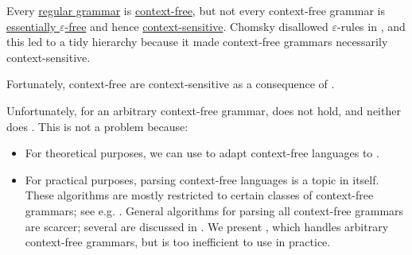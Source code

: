 \begin{remark}\label{rem:chomsky_hierarchy_failure}
  Every \hyperref[def:chomsky_hierarchy/regular]{regular grammar} is \hyperref[def:chomsky_hierarchy/context_free]{context-free}, but not every context-free grammar is \hyperref[def:epsilon_free_grammar]{essentially \( \varepsilon \)-free} and hence \hyperref[def:chomsky_hierarchy/context_sensitive]{context-sensitive}. Chomsky disallowed \( \varepsilon \)-rules in \cite[def. 6]{Chomsky1959}, and this led to a tidy hierarchy because it made context-free grammars necessarily context-sensitive.

  Fortunately, context-free  are context-sensitive as a consequence of .

  Unfortunately, for an arbitrary context-free grammar,  does not hold, and neither does . This is not a problem because:
  \begin{itemize}
    \item For theoretical purposes, we can use  to adapt context-free languages to .

    \item For practical purposes, parsing context-free languages is a topic in itself. These algorithms are mostly restricted to certain classes of context-free grammars; see e.g. \cite[ch. 6]{Salomaa1987}. General algorithms for parsing all context-free grammars are scarcer; several are discussed in \cite{Economopoulos2006}. We present , which handles arbitrary context-free grammars, but is too inefficient to use in practice.
  \end{itemize}
\end{remark}

